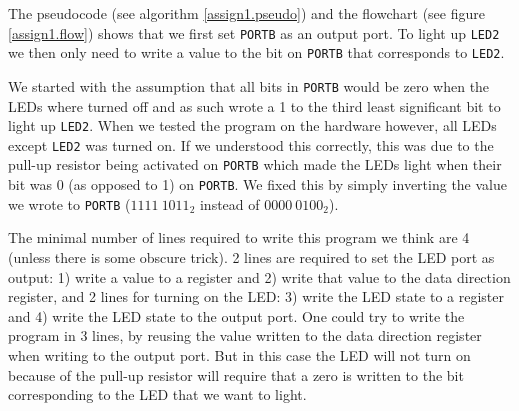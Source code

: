 The pseudocode (see algorithm \ref{assign1.pseudo}) and the flowchart (see figure \ref{assign1.flow}) shows that we first set \texttt{PORTB} as an output port. To light up \texttt{LED2} we then only need to write a value to the bit on \texttt{PORTB} that corresponds to \texttt{LED2}. 

We started with the assumption that all bits in \texttt{PORTB} would be zero when the LEDs where turned off and as such wrote a 1 to the third least significant bit to light up \texttt{LED2}. When we tested the program on the hardware however, all LEDs except \texttt{LED2} was turned on. If we understood this correctly, this was due to the pull-up resistor being activated on \texttt{PORTB} which made the LEDs light when their bit was 0 (as opposed to 1) on \texttt{PORTB}. We fixed this by simply inverting the value we wrote to \texttt{PORTB} (${1111\ 1011}_2$ instead of ${0000\ 0100}_2$).

The minimal number of lines required to write this program we think are 4 (unless there is some obscure trick). 2 lines are required to set the LED port as output: 1) write a value to a register and 2) write that value to the data direction register, and 2 lines for turning on the LED: 3) write the LED state to a register and 4) write the LED state to the output port. One could try to write the program in 3 lines, by reusing the value written to the data direction register when writing to the output port. But in this case the LED will not turn on because of the pull-up resistor will require that a zero is written to the bit corresponding to the LED that we want to light.
